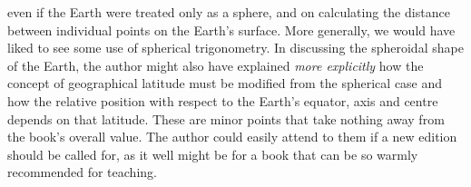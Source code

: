 %
even if the Earth were treated only as a sphere, and on calculating the distance between individual points on the Earth's surface. More generally, we would have liked to see some use of spherical trigonometry. In discussing the spheroidal shape of the Earth, the author might also have explained \textit{more explicitly} how the concept of geographical latitude must be modified from the spherical case and how the relative position with respect to the Earth's equator, axis and centre depends on that latitude. These are minor points that take nothing away from the book's overall value. The author could easily attend to them if a new edition should be called for, as it well might be for a book that can be so warmly recommended for teaching.

